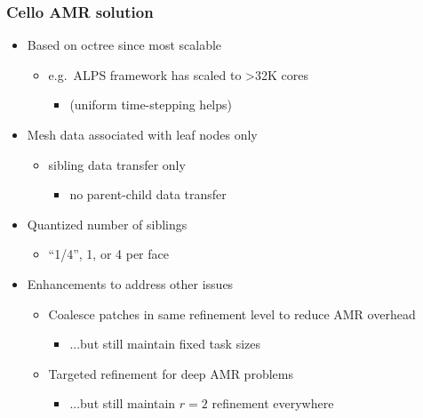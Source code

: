 \begin{frame}[fragile] 
\frametitle{Cello AMR solution}
\begin{itemize}
\item  Based on octree since most scalable
\begin{itemize}
\item    e.g.~ALPS framework has scaled to >32K cores
\begin{itemize}
\item      (uniform time-stepping helps)
\end{itemize}
\end{itemize}
\item Mesh data associated with leaf nodes only
\begin{itemize}
\item   sibling data transfer only
\begin{itemize}
\item     no parent-child data transfer
\end{itemize}
\end{itemize}
\item Quantized number of siblings
\begin{itemize}
\item   ``1/4'', 1, or 4 per face
\end{itemize}
\item Enhancements to address other issues
\begin{itemize}
\item   Coalesce patches in same refinement level to reduce AMR overhead
\begin{itemize}
\item     ...but still maintain fixed task sizes
\end{itemize}
\item   Targeted refinement for deep AMR problems
\begin{itemize}
\item      ...but still maintain $r=2$ refinement everywhere
\end{itemize}
\end{itemize}
\end{itemize}
\end{frame}

